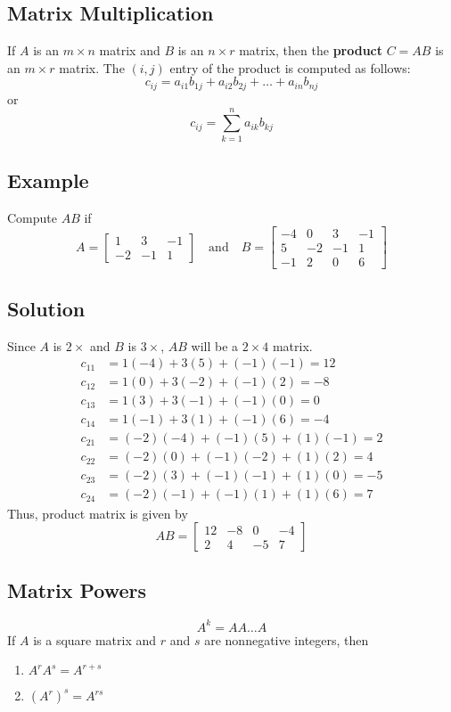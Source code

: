\subsection*{Matrix Multiplication}
If $A$ is an $m\times n$ matrix and $B$ is an $n\times r$ matrix, then the \textbf{product}
$C=AB$ is an $m\times r$ matrix. The $(i,j)$ entry of the product is computed as follows:
\[c_{ij}=a_{i1}b_{1j}+a_{i2}b_{2j}+\dots+a_{in}b_{nj}\]
or
\[c_{ij}=\sum_{k=1}^n a_{ik}b_{kj}\]

\subsection*{Example}
Compute $AB$ if
\[
    A=\begin{bmatrix}
        1  & 3  & -1 \\
        -2 & -1 & 1
    \end{bmatrix} \quad \text{and} \quad
    B=\begin{bmatrix}
        -4 & 0  & 3  & -1 \\
        5  & -2 & -1 & 1  \\
        -1 & 2  & 0  & 6
    \end{bmatrix}
\]

\subsection*{Solution}
Since $A$ is $2\times$ and $B$ is $3\times$, $AB$ will be a $2\times4$ matrix.
\begin{align*}
    c_{11} & =1(-4)+3(5)+(-1)(-1)=12     \\
    c_{12} & =1(0)+3(-2)+(-1)(2)=-8      \\
    c_{13} & =1(3)+3(-1)+(-1)(0)=0       \\
    c_{14} & =1(-1)+3(1)+(-1)(6)=-4      \\
    c_{21} & =(-2)(-4)+(-1)(5)+(1)(-1)=2 \\
    c_{22} & =(-2)(0)+(-1)(-2)+(1)(2)=4  \\
    c_{23} & =(-2)(3)+(-1)(-1)+(1)(0)=-5 \\
    c_{24} & =(-2)(-1)+(-1)(1)+(1)(6)=7
\end{align*}
Thus, product matrix is given by
\[AB=\begin{bmatrix}
        12 & -8 & 0  & -4 \\
        2  & 4  & -5 & 7
    \end{bmatrix}\]

\subsection*{Matrix Powers}
\[A^k=AA\dots A\]
If $A$ is a square matrix and $r$ and $s$ are nonnegative integers, then
\begin{enumerate}
    \item $A^rA^s=A^{r+s}$
    \item $(A^r)^s=A^{rs}$
\end{enumerate}

